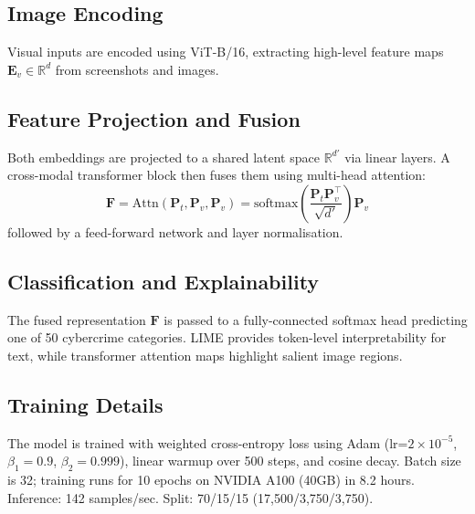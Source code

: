 \subsection{Image Encoding}
Visual inputs are encoded using ViT-B/16, extracting 
high-level feature maps $\mathbf{E}_v \in \mathbb{R}^{d}$ 
from screenshots and images.

\subsection{Feature Projection and Fusion}
Both embeddings are projected to a shared latent space 
$\mathbb{R}^{d'}$ via linear layers. A cross-modal 
transformer block then fuses them using multi-head 
attention:
\begin{equation}
\mathbf{F} = \text{Attn}(\mathbf{P}_t, \mathbf{P}_v, 
\mathbf{P}_v) = \text{softmax}
\!\left(\frac{\mathbf{P}_t \mathbf{P}_v^\top}
{\sqrt{d'}}\right)\mathbf{P}_v
\end{equation}
followed by a feed-forward network and layer 
normalisation.

\subsection{Classification and Explainability}
The fused representation $\mathbf{F}$ is passed to a 
fully-connected softmax head predicting one of 50 
cybercrime categories. LIME provides token-level 
interpretability for text, while transformer attention 
maps highlight salient image regions.

\subsection{Training Details}
The model is trained with weighted cross-entropy loss
using Adam (lr=$2\times10^{-5}$, $\beta_1{=}0.9$,
$\beta_2{=}0.999$), linear warmup over 500 steps, and
cosine decay. Batch size is 32; training runs for 10
epochs on NVIDIA A100 (40GB) in 8.2 hours. Inference:
142 samples/sec. Split: 70/15/15 (17,500/3,750/3,750).